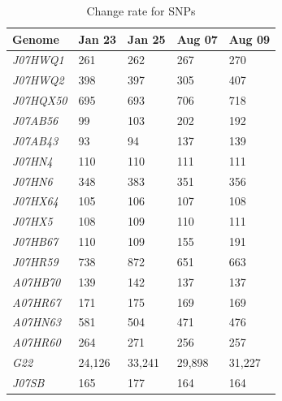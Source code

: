 \begin{table}[hbt]
  \caption{Change rate for SNPs}
  \begin{tabularx}{\textwidth}{L{2.2cm}R{2cm}R{3cm}R{3.2cm}R{2cm}}
  \hline
    \textbf{Genome} & \textbf{Jan 23} & \textbf{Jan 25} & \textbf{Aug 07} & \textbf{Aug 09} \\
    \hline
     \textit{J07HWQ1} & 261 & 262 & 267 & 270 \\
     \textit{J07HWQ2} & 398 & 397 & 305 & 407 \\
     \textit{J07HQX50} & 695 & 693 & 706 & 718 \\
     \textit{J07AB56} & 99 & 103 & 202 & 192 \\
     \textit{J07AB43} & 93 & 94 & 137 & 139 \\
     \textit{J07HN4} & 110 & 110 & 111 & 111 \\
     \textit{J07HN6} & 348 & 383 & 351 & 356 \\
     \textit{J07HX64} & 105 & 106 & 107 & 108 \\
     \textit{J07HX5} & 108 & 109 & 110 & 111 \\
     \textit{J07HB67} & 110 & 109 & 155 & 191 \\
     \textit{J07HR59} & 738 & 872 & 651 & 663 \\
     \textit{A07HB70} & 139 & 142 & 137 & 137 \\
     \textit{A07HR67} & 171 & 175 & 169 & 169 \\
     \textit{A07HN63} & 581 & 504 & 471 & 476 \\
     \textit{A07HR60} & 264 & 271 & 256 & 257 \\
     \textit{G22} & 24,126 & 33,241 & 29,898 & 31,227 \\
     \textit{J07SB} & 165 & 177 & 164 & 164 \\     
  \end{tabularx}
  \label{ChangeRate}
\end{table}

